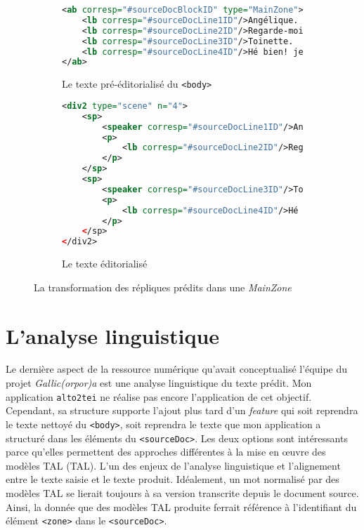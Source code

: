 \documentclass[class=article, crop=false]{standalone}
\begin{document}
\begin{figure}[ht]
\centering

\begin{subfigure}[b]{\textwidth}
\begin{lstlisting}[language=XML]
<ab corresp="#sourceDocBlockID" type="MainZone">
	<lb corresp="#sourceDocLine1ID"/>Angélique.
	<lb corresp="#sourceDocLine2ID"/>Regarde-moi un peu.
	<lb corresp="#sourceDocLine3ID"/>Toinette.
	<lb corresp="#sourceDocLine4ID"/>Hé bien! je vous regarde.
</ab>
\end{lstlisting}
\caption{Le texte pré-éditorialisé du \texttt{<body>}}
\end{subfigure}

\hspace{1cm}%

\begin{subfigure}[b]{\textwidth}
\begin{lstlisting}[language=XML]
<div2 type="scene" n="4">
	<sp>
		<speaker corresp="#sourceDocLine1ID"/>Angélique.</speaker>
		<p>
			<lb corresp="#sourceDocLine2ID"/>Regarde-moi un peu.
		</p>
	</sp>
	<sp>
		<speaker corresp="#sourceDocLine3ID"/>Toinette.</speaker>
		<p>
			<lb corresp="#sourceDocLine4ID"/>Hé bien! je vous regarde.
		</p>
	</sp>
</div2>
\end{lstlisting}
\caption{Le texte éditorialisé}
\end{subfigure}

\hspace{1cm}%

\caption{La transformation des répliques prédits dans une \textit{MainZone}}
\label{fig:drame}
\end{figure}

\section{L'analyse linguistique}
Le dernière aspect de la ressource numérique qu'avait conceptualisé l'équipe du projet \textit{Gallic(orpor)a} est une analyse linguistique du texte prédit. Mon application \texttt{alto2tei} ne réalise pas encore l'application de cet objectif. Cependant, sa structure supporte l'ajout plus tard d'un \textit{feature} qui soit reprendra le texte nettoyé du \texttt{<body>}, soit reprendra le texte que mon application a structuré dans les éléments du \texttt{<sourceDoc>}. Les deux options sont intéressants parce qu'elles permettent des approches différentes à la mise en œuvre des modèles \acrshort{TAL} (\acrlong{TAL}). L'un des enjeux de l'analyse linguistique et l'alignement entre le texte saisie et le texte produit. Idéalement, un mot normalisé par des modèles \acrshort{TAL} se lierait toujours à sa version transcrite depuis le document source. Ainsi, la donnée que des modèles \acrshort{TAL} produite ferrait référence à l'identifiant du élément \texttt{<zone>} dans le \texttt{<sourceDoc>}.
\end{document}
